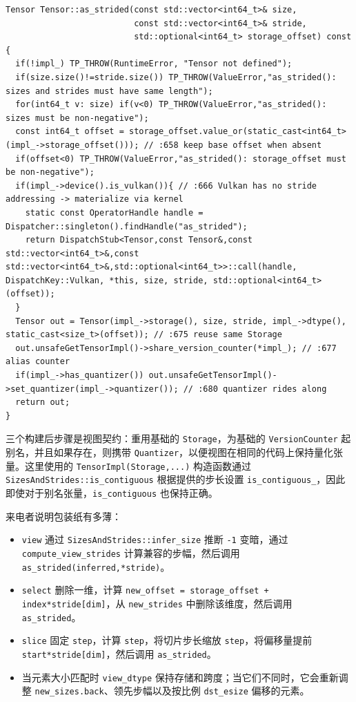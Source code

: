 \begin{lstlisting}[caption={\texttt{as\_strided}: reuse storage, share counter.}, label=lst:asstrided]
Tensor Tensor::as_strided(const std::vector<int64_t>& size,
                          const std::vector<int64_t>& stride,
                          std::optional<int64_t> storage_offset) const {
  if(!impl_) TP_THROW(RuntimeError, "Tensor not defined");
  if(size.size()!=stride.size()) TP_THROW(ValueError,"as_strided(): sizes and strides must have same length");
  for(int64_t v: size) if(v<0) TP_THROW(ValueError,"as_strided(): sizes must be non-negative");
  const int64_t offset = storage_offset.value_or(static_cast<int64_t>(impl_->storage_offset())); // :658 keep base offset when absent
  if(offset<0) TP_THROW(ValueError,"as_strided(): storage_offset must be non-negative");
  if(impl_->device().is_vulkan()){ // :666 Vulkan has no stride addressing -> materialize via kernel
    static const OperatorHandle handle = Dispatcher::singleton().findHandle("as_strided");
    return DispatchStub<Tensor,const Tensor&,const std::vector<int64_t>&,const std::vector<int64_t>&,std::optional<int64_t>>::call(handle, DispatchKey::Vulkan, *this, size, stride, std::optional<int64_t>(offset));
  }
  Tensor out = Tensor(impl_->storage(), size, stride, impl_->dtype(), static_cast<size_t>(offset)); // :675 reuse same Storage
  out.unsafeGetTensorImpl()->share_version_counter(*impl_); // :677 alias counter
  if(impl_->has_quantizer()) out.unsafeGetTensorImpl()->set_quantizer(impl_->quantizer()); // :680 quantizer rides along
  return out;
}
\end{lstlisting}

三个构建后步骤是视图契约：重用基础的 \texttt{Storage}，为基础的 \texttt{VersionCounter} 起别名，并且如果存在，则携带 \texttt{Quantizer}，以便视图在相同的代码上保持量化张量。这里使用的 \texttt{TensorImpl(Storage,...)} 构造函数通过 \texttt{SizesAndStrides::is\_contiguous} 根据提供的步长设置 \texttt{is\_contiguous\_}，因此即使对于别名张量，\texttt{is\_contiguous} 也保持正确。

来电者说明包装纸有多薄：

\begin{itemize}[leftmargin=1.2em]
\item \texttt{view} 通过 \texttt{SizesAndStrides::infer\_size} 推断 \texttt{-1} 变暗，通过 \texttt{compute\_view\_strides} 计算兼容的步幅，然后调用 \texttt{as\_strided(inferred,*stride)}。
\item \texttt{select} 删除一维，计算 \texttt{new\_offset = storage\_offset + index*stride[dim]}，从 \texttt{new\_strides} 中删除该维度，然后调用 \texttt{as\_strided}。
\item \texttt{slice} 固定 \texttt{step}，计算 \texttt{step}，将切片步长缩放 \texttt{step}，将偏移量提前 \texttt{start*stride[dim]}，然后调用 \texttt{as\_strided}。
\item 当元素大小匹配时 \texttt{view\_dtype} 保持存储和跨度；当它们不同时，它会重新调整 \texttt{new\_sizes.back}、领先步幅以及按比例 \texttt{dst\_esize} 偏移的元素。
\end{itemize}

